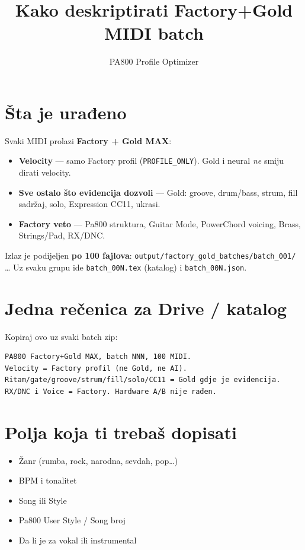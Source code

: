 \documentclass[11pt,a4paper]{article}
\title{Kako deskriptirati Factory+Gold MIDI batch}
\author{PA800 Profile Optimizer}
\begin{document}
\maketitle

\section{Šta je urađeno}
Svaki MIDI prolazi \textbf{Factory + Gold MAX}:
\begin{itemize}
  \item \textbf{Velocity} --- samo Factory profil (\texttt{PROFILE\_ONLY}). Gold i neural \emph{ne} smiju dirati velocity.
  \item \textbf{Sve ostalo što evidencija dozvoli} --- Gold: groove, drum/bass, strum, fill sadržaj, solo, Expression CC11, ukrasi.
  \item \textbf{Factory veto} --- Pa800 struktura, Guitar Mode, PowerChord voicing, Brass, Strings/Pad, RX/DNC.
\end{itemize}

Izlaz je podijeljen \textbf{po 100 fajlova}:
\texttt{output/factory\_gold\_batches/batch\_001/} \ldots{}
Uz svaku grupu ide \texttt{batch\_00N.tex} (katalog) i \texttt{batch\_00N.json}.

\section{Jedna rečenica za Drive / katalog}
Kopiraj ovo uz svaki batch zip:

\begin{verbatim}
PA800 Factory+Gold MAX, batch NNN, 100 MIDI.
Velocity = Factory profil (ne Gold, ne AI).
Ritam/gate/groove/strum/fill/solo/CC11 = Gold gdje je evidencija.
RX/DNC i Voice = Factory. Hardware A/B nije rađen.
\end{verbatim}

\section{Polja koja ti trebaš dopisati}
\begin{itemize}
  \item Žanr (rumba, rock, narodna, sevdah, pop\ldots)
  \item BPM i tonalitet
  \item Song ili Style
  \item Pa800 User Style / Song broj
  \item Da li je za vokal ili instrumental
\end{itemize}
\end{document}

